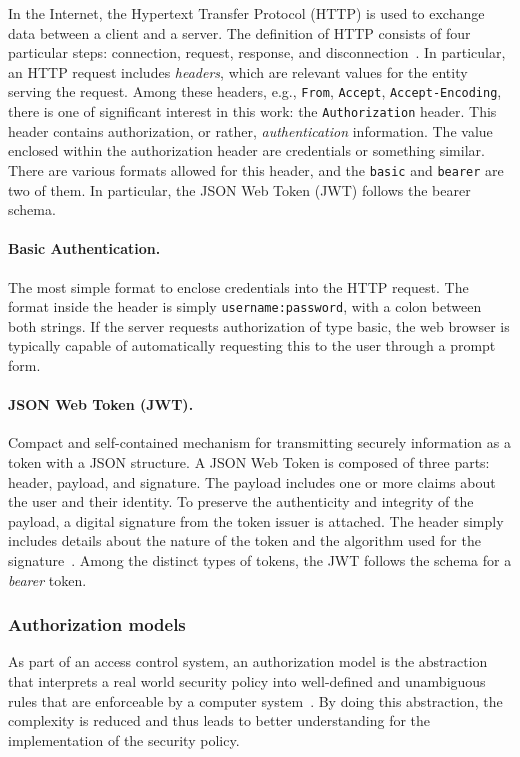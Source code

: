 \documentclass[12pt]{article}
\begin{document}
In the Internet, the Hypertext Transfer Protocol (HTTP) is used to exchange data between a client and a server. The definition of HTTP consists of four particular steps: connection, request, response, and disconnection~\cite{RFC2616}. In particular, an HTTP request includes \emph{headers}, which are relevant values for the entity serving the request. Among these headers, e.g., \texttt{From}, \texttt{Accept}, \texttt{Accept-Encoding}, there is one of significant interest in this work: the \texttt{Authorization} header. This header contains authorization, or rather, \emph{authentication} information. The value enclosed within the authorization header are credentials or something similar. There are various formats allowed for this header, and the \texttt{basic} and \texttt{bearer} are two of them. In particular, the JSON Web Token (JWT) follows the bearer schema.

\paragraph{Basic Authentication.} The most simple format to enclose credentials into the HTTP request. The format inside the header is simply \texttt{username:password}, with a colon between both strings. If the server requests authorization of type basic, the web browser is typically capable of automatically requesting this to the user through a prompt form. 

\paragraph{JSON Web Token (JWT).} Compact and self-contained mechanism for transmitting securely information as a token with a JSON structure. A JSON Web Token is composed of three parts: header, payload, and signature. The payload includes one or more claims about the user and their identity. To preserve the authenticity and integrity of the payload, a digital signature from the token issuer is attached. The header simply includes details about the nature of the token and the algorithm used for the signature~\cite{RFC7519}. Among the distinct types of tokens, the JWT follows the schema for a \emph{bearer} token. 

\subsubsection{Authorization models}

As part of an access control system, an authorization model is the abstraction that interprets a real world security policy into well-defined and unambiguous rules that are enforceable by a computer system~\cite{access_01}. By doing this abstraction, the complexity is reduced and thus leads to better understanding for the implementation of the security policy. 
\end{document}
